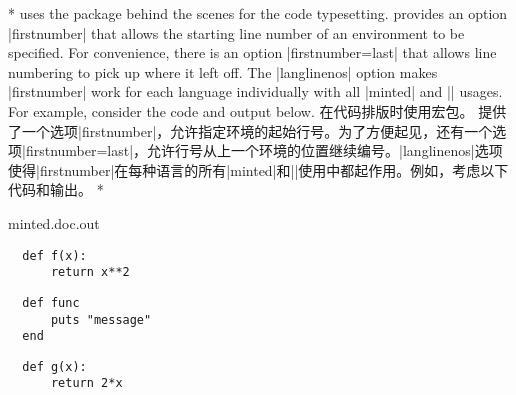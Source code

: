 \begin{paracol}{2}
\switchcolumn[0]*%
 uses the  package behind the scenes for the code typesetting.   provides an option |firstnumber| that allows the starting line number of an environment to be specified.  For convenience, there is an option |firstnumber=last| that allows line numbering to pick up where it left off.  The |langlinenos| option makes |firstnumber| work for each language individually with all |minted| and |\mint| usages.  For example, consider the code and output below.
\switchcolumn
{}
在代码排版时使用宏包。 提供了一个选项|firstnumber|，允许指定环境的起始行号。为了方便起见，还有一个选项|firstnumber=last|，允许行号从上一个环境的位置继续编号。|langlinenos|选项使得|firstnumber|在每种语言的所有|minted|和|\mint|使用中都起作用。例如，考虑以下代码和输出。
\switchcolumn[0]*%
\begin{VerbatimOut}[gobble=1]{minted.doc.out}
  \begin{verbatim}
  def f(x):
      return x**2
  \end{verbatim}

  \begin{verbatim}
  def func
      puts "message"
  end
  \end{verbatim}

  \begin{verbatim}
  def g(x):
      return 2*x
  \end{verbatim}
\end{VerbatimOut}
\inputminted[frame=single, rulecolor=minted@linkcolor]{latex}{minted.doc.out}
\switchcolumn
\hfill
\colorbox{minted@samplebg}{\begin{minipage}{0.4\textwidth}
  
\end{minipage}}
\hfill\hfill


\end{paracol}
